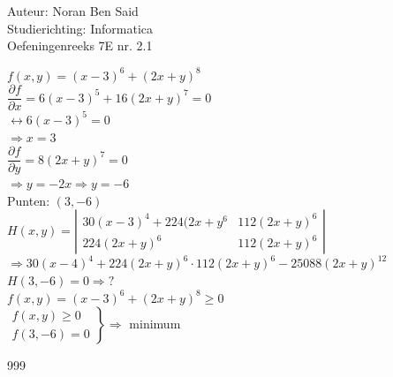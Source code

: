 \documentclass[a4paper]{article}
\begin{document}
  
\noindent \large Auteur: Noran Ben Said \\
\noindent \large Studierichting: Informatica\\
\noindent \large Oefeningenreeks 7E nr. 2.1\\

\medskip

\normalsize

$f(x,y) = (x-3)^6+(2x+y)^8$\\

$\dfrac{\partial f}{\partial x} = 6(x-3)^5+16(2x+y)^7 = 0$\\

$\leftrightarrow 6(x-3)^5 = 0$\\

$\Rightarrow x = 3$\\

$\dfrac{\partial f}{\partial y} = 8(2x+y)^7 = 0$\\

$\Rightarrow y = -2x \Rightarrow y = -6$\\

Punten: $(3, -6)$\\

$H(x,y) =
\left|
\begin{array}{ccc}
30(x-3)^4 + 224(2x+y^6 & 112(2x+y)^6\\
224(2x+y)^6 & 112(2x+y)^6
\end{array}
\right|
$\\

$\Rightarrow 30(x-4)^4+224(2x+y)^6\cdot112(2x+y)^6-25088(2x+y)^{12}$\\

$H(3, -6) = 0 \Rightarrow ?$\\

$f(x,y) = (x-3)^6+(2x+y)^8 \ge 0$\\

$
\left.
\begin{array}{l}
f(x,y) \geq 0\\
f(3, -6) = 0
\end{array}
\right\} \Rightarrow$ minimum\\

\begin{thebibliography}{999}
\end{thebibliography}
\end{document}
